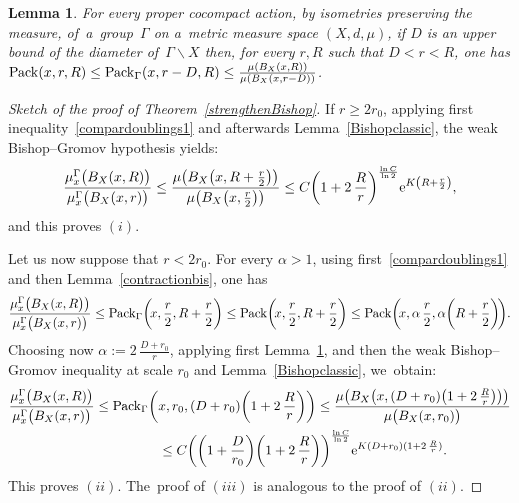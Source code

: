 \documentclass[pdftex]{sigma}
\numberwithin{equation}{section}
\newtheorem{Lemma}[theor]{Lemma}
\begin{document}
{\sloppy
\begin{Lemma}\label{CovervsPack0} For every proper cocompact action, by isometries preserving the measure, of~a~group~$\Gamma$ on a~metric measure space $(X,d, \mu)$, if $D$ is an upper bound of the diameter of~$ \Gamma \backslash X$ then, for every $r, R$ such that $D < r < R$, one has
${\rm Pack}(x,r,R)\le {\rm Pack}_\Gamma (x,r - D,R) \le \frac{\mu (B_X ( x, R))}{\mu (B_X (x, r- D))}$.
\end{Lemma}

}

\begin{proof}[Sketch of the proof of Theorem~\ref{strengthenBishop}]
If $r \ge 2 r_0$, applying first inequality~\eqref{compardoublings1} and afterwards Lemma~\ref{Bishopclassic}, the weak Bishop--Gromov hypothesis yields:
\begin{gather*}
\dfrac{\mu_{x}^{\Gamma} \big(B_X(x, R)\big)}{\mu_{x}^{\Gamma} \big(B_X (x, r)\big)}
\le \dfrac{\mu \big(B_X\big(x, R + \frac{r}{2}\big)\big)}{\mu \big(B_X\big(x,\frac{r}{2}\big)\big)}
\le C \bigg(1 +2 \, \frac{R}{r}\bigg)^{\frac{\ln C}{\ln 2}} {\rm e}^{K \left(R + \frac{r}{2}\right)},
\end{gather*}
and this proves $(i)$.

Let us now suppose that $r < 2 r_0$. For every $\alpha > 1$, using first~\eqref{compardoublings1} and then Lemma~\ref{contractionbis}, one has
\begin{gather*}
\dfrac{\mu_{x}^{\Gamma} \big(B_X (x, R\big)\big)}{\mu_{x}^{\Gamma}\big(B_X (x, r)\big)}
\le {\rm Pack}_\Gamma \bigg(\!x, \frac{r}{2}, R + \frac{r}{2}\bigg)
\le {\rm Pack} \bigg(\!x, \frac{r}{2}, R + \frac{r}{2}\bigg)
\le {\rm Pack} \bigg(\!x,\alpha\,\frac{r}{2}, \alpha \bigg(R + \frac{r}{2} \bigg)\!\bigg).
\end{gather*}
Choosing now $\alpha := 2\, \frac{D + r_0}{r}$, applying first Lemma~\ref{CovervsPack0}, and then the weak Bishop--Gromov inequality at scale $r_0$
and Lemma~\ref{Bishopclassic}, we~obtain:
\begin{gather*}
\dfrac{\mu_{x}^{\Gamma} \big(B_X(x, R)\big)}{\mu_{x}^{\Gamma} \big(B_X (x,r)\big)}
\le {\rm Pack}_\Gamma \bigg(x,r_0, (D+ r_0)\bigg(1 +2\,\frac{R}{r}\bigg)\bigg)
\le \dfrac{\mu \big(B_X \big(x, (D+ r_0) \big(1 +2\,\frac{R}{r}\big)\big)\big)}{\mu \big(B_X(x,r_0)\big)}
\\ \hphantom{\dfrac{\mu_{x}^{\Gamma} \big(B_X(x, R)\big)}{\mu_{x}^{\Gamma} \big(B_X (x,r)\big)}}
{}\le C \bigg(\bigg(1 + \frac{D}{r_0}\bigg)\bigg(1 +2\,\frac{R}{r}\bigg)\bigg)^{\frac{\ln C}{\ln 2}} {\rm e}^{K (D+ r_0) ( 1 +2 \, \frac{R}{r})}.
\end{gather*}
This proves $(ii)$. The~proof of $(iii)$ is analogous to the proof of $(ii)$.
\end{proof}
\end{document}
